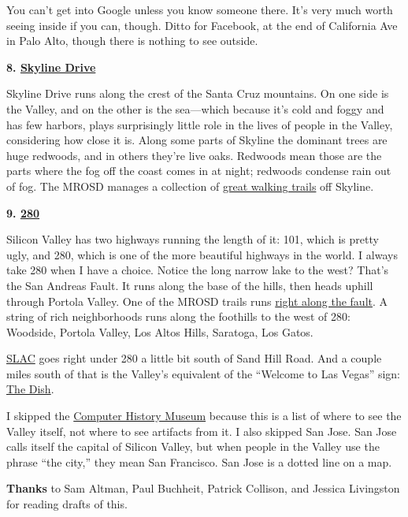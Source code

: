 You can't get into Google unless you know someone there. It's very much
worth seeing inside if you can, though. Ditto for Facebook, at the end
of California Ave in Palo Alto, though there is nothing to see outside.

\textbf{8. \href{http://maps.google.com/maps?q=skylonda}{Skyline Drive}}

Skyline Drive runs along the crest of the Santa Cruz mountains. On one
side is the Valley, and on the other is the sea---which because it's
cold and foggy and has few harbors, plays surprisingly little role in
the lives of people in the Valley, considering how close it is. Along
some parts of Skyline the dominant trees are huge redwoods, and in
others they're live oaks. Redwoods mean those are the parts where the
fog off the coast comes in at night; redwoods condense rain out of fog.
The MROSD manages a collection of \href{http://www.openspace.org/}{great
walking trails} off Skyline.

\textbf{9.
\href{http://maps.google.com/maps?q=interstate+280+san+mateo}{280}}

Silicon Valley has two highways running the length of it: 101, which is
pretty ugly, and 280, which is one of the more beautiful highways in the
world. I always take 280 when I have a choice. Notice the long narrow
lake to the west? That's the San Andreas Fault. It runs along the base
of the hills, then heads uphill through Portola Valley. One of the MROSD
trails runs
\href{http://www.openspace.org/preserves/pr_los_trancos.asp}{right along
the fault}. A string of rich neighborhoods runs along the foothills to
the west of 280: Woodside, Portola Valley, Los Altos Hills, Saratoga,
Los Gatos.

\href{http://www.flickr.com/photos/38037974@N00/3890299362/}{SLAC} goes
right under 280 a little bit south of Sand Hill Road. And a couple miles
south of that is the Valley's equivalent of the ``Welcome to Las Vegas''
sign: \href{http://www.flickr.com/photos/paulbarroga/3443486941/}{The
Dish}.


I skipped the \href{http://www.computerhistory.org/}{Computer History
Museum} because this is a list of where to see the Valley itself, not
where to see artifacts from it. I also skipped San Jose. San Jose calls
itself the capital of Silicon Valley, but when people in the Valley use
the phrase ``the city,'' they mean San Francisco. San Jose is a dotted
line on a map.

\textbf{Thanks} to Sam Altman, Paul Buchheit, Patrick Collison, and
Jessica Livingston for reading drafts of this.